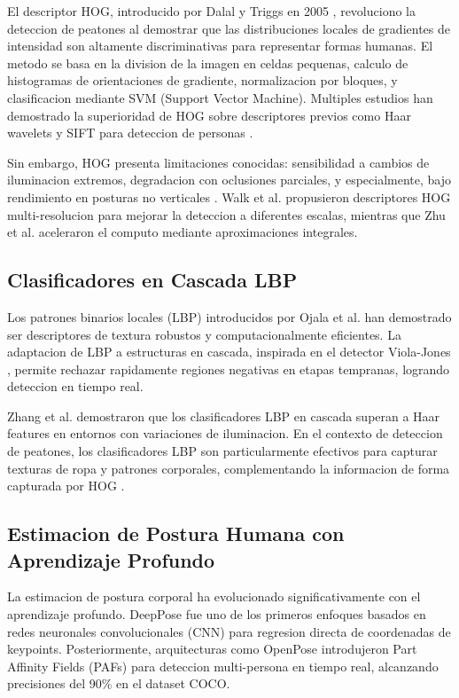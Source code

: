 \documentclass[conference]{IEEEtran}
\begin{document}
El descriptor HOG, introducido por Dalal y Triggs en 2005 \cite{dalal2005histograms}, revoluciono la deteccion de peatones al demostrar que las distribuciones locales de gradientes de intensidad son altamente discriminativas para representar formas humanas. El metodo se basa en la division de la imagen en celdas pequenas, calculo de histogramas de orientaciones de gradiente, normalizacion por bloques, y clasificacion mediante SVM (Support Vector Machine). Multiples estudios han demostrado la superioridad de HOG sobre descriptores previos como Haar wavelets y SIFT para deteccion de personas \cite{dollar2012pedestrian, enzweiler2009monocular}.

Sin embargo, HOG presenta limitaciones conocidas: sensibilidad a cambios de iluminacion extremos, degradacion con oclusiones parciales, y especialmente, bajo rendimiento en posturas no verticales \cite{benenson2014ten}. Walk et al. \cite{walk2010multi} propusieron descriptores HOG multi-resolucion para mejorar la deteccion a diferentes escalas, mientras que Zhu et al. \cite{zhu2006fast} aceleraron el computo mediante aproximaciones integrales.

\subsection{Clasificadores en Cascada LBP}

Los patrones binarios locales (LBP) introducidos por Ojala et al. \cite{ojala2002multiresolution} han demostrado ser descriptores de textura robustos y computacionalmente eficientes. La adaptacion de LBP a estructuras en cascada, inspirada en el detector Viola-Jones \cite{viola2004robust}, permite rechazar rapidamente regiones negativas en etapas tempranas, logrando deteccion en tiempo real.

Zhang et al. \cite{zhang2007local} demostraron que los clasificadores LBP en cascada superan a Haar features en entornos con variaciones de iluminacion. En el contexto de deteccion de peatones, los clasificadores LBP son particularmente efectivos para capturar texturas de ropa y patrones corporales, complementando la informacion de forma capturada por HOG \cite{walk2010multi}.

\subsection{Estimacion de Postura Humana con Aprendizaje Profundo}

La estimacion de postura corporal ha evolucionado significativamente con el aprendizaje profundo. DeepPose \cite{toshev2014deeppose} fue uno de los primeros enfoques basados en redes neuronales convolucionales (CNN) para regresion directa de coordenadas de keypoints. Posteriormente, arquitecturas como OpenPose \cite{cao2017realtime} introdujeron Part Affinity Fields (PAFs) para deteccion multi-persona en tiempo real, alcanzando precisiones del 90\% en el dataset COCO.
\end{document}
